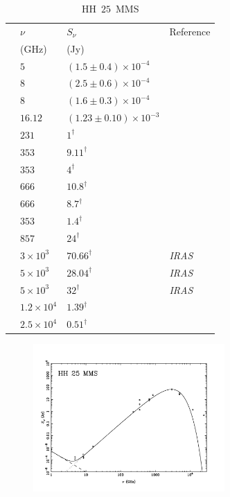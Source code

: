 \documentclass[9pt]{extarticle}   	%
\begin{document}
\begin{table}
\caption{HH~$25$~MMS}
\begin{center}
\begin{tabular}{llll}
\hline
 & $\nu$ & $S_\nu$ & Reference\\
 & (GHz) & (Jy) & \\
\hline
 & $5$ & $(1.5\pm0.4)\times10^{-4}$ & \citet{1995AA...297...98B}\\
 & $8$ & $(2.5\pm0.6)\times10^{-4}$ & \citet{1995AA...297...98B}\\
 & $8$ & $(1.6\pm0.3)\times10^{-4}$ & \citet{1999MNRAS.304....1G}\\
 & $16.12$ & $(1.23\pm0.10)\times10^{-3}$ & \citet{2012MNRAS.423.1089A}\\
 & $231$ & $1^{\dag}$ & \citet{1999ApJ...527..856L}\\
 & $353$ & $9.11^{\dag}$ & \citet{2008ApJS..175..277D}\\
 & $353$ & $4^{\dag}$ & \citet{2007MNRAS.374.1413N}\\
 & $666$ & $10.8^{\dag}$ & \citet{2007MNRAS.374.1413N}\\
 & $666$ & $8.7^{\dag}$ & \citet{2001MNRAS.326..927P}\\
 & $353$ & $1.4^{\dag}$ & \citet{2001MNRAS.326..927P}\\
 & $857$ & $24^{\dag}$ & \citet{1999ApJ...527..856L}\\
 & $3\times10^{3}$ & $70.66^{\dag}$ & \textit{IRAS}\\
 & $5\times10^{3}$ & $28.04^{\dag}$ & \textit{IRAS}\\
 & $5\times10^{3}$ & $32^{\dag}$ & \textit{IRAS}\\
 & $1.2\times10^{4}$ & $1.39^{\dag}$ & \citet{1999yCat.2225....0G}\\
 & $2.5\times10^{4}$ & $0.51^{\dag}$ & \citet{1999yCat.2225....0G}\\
\end{tabular}
\end{center}
\label{default}
\end{table}%


\begin{figure}[htbp]
\begin{center}
\includegraphics[width=0.65\textwidth]{plots/HH25MMS.pdf}
\label{default}
\end{center}
\end{figure}


\clearpage



\end{document}
